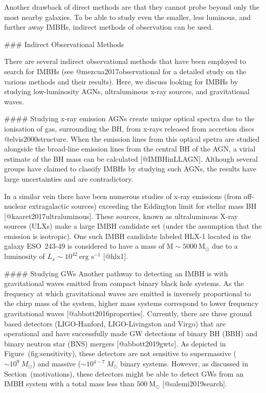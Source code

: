 {{{{{{{{{{{{{{{{Another drawback of direct methods are that they cannot probe beyond
only the most nearby galaxies. To be able to study even the smaller, less
luminous, and further away IMBHs, indirect methods of observation can be
used.

### Indirect Observational Methods

There are several indirect observational methods that have been employed
to search for IMBHs (see @mezcua2017observational for a detailed
study on the various methods and their results). Here, we discuss
looking for IMBHs by studying low-luminosity AGNs, ultraluminous x-ray
sources, and gravitational waves.

#### Studying x-ray emission
AGNs create unique optical spectra due to the ionisation of gas,
surrounding the BH, from x-rays released from accretion discs
@elvis2000structure. When the emission lines from this optical spetra are
studied alongside the broad-line emission lines from the central BH of
the AGN, a virial estimate of the BH mass can be calculated
[@IMBHinLLAGN]. Although several groups have claimed to classify IMBHs
by studying such AGNs, the results have large uncertainties and are
contradictory.

In a similar vein there have been numerous studies of x-ray emissions
(from off-nuclear extragalactic sources) exceeding the Eddington limit
for stellar mass BH [@kaaret2017ultraluminous]. These sources, known as
ultraluminous X-ray sources (ULXs) make a large IMBH candidate set
(under the assumption that the emission is isotropic). One such IMBH
candidate labeled HLX-1 located in the galaxy ESO~243-49 is considered
to have a mass of $\text{M}\sim5000\ \text{M}_{\odot}$ due to a luminosity of
$L_x\sim10^{42}\ \text{erg s}^{-1}$ [@hlx1].

#### Studying GWs
Another pathway to detecting an IMBH is with gravitational waves emitted
from compact binary black hole systems. As the frequency at which
gravitational waves are emitted is inversely proportional to the chirp
mass of the system, higher mass systems correspond to lower frequency
gravitational waves [@abbott2016properties]. Currently, there are three
ground based detectors (LIGO-Hanford, LIGO-Livingston and Virgo) that
are operational and have successfully made GW detections of binary BH
(BBH) and binary neutron star (BNS) mergers [@abbott2019gwtc]. As
depicted in Figure~\@ref(fig:sensitivity), these detectors are not
sensitive to supermassive ($\sim10^9\ M_{\odot}$) and massive
($\sim10^{4-7}\ M_{\odot}$ binary systems. However, as discussed
in Section~\@ref(motivations), these detectors might be able to detect
GWs from an IMBH system with a total mass less than $500\
\text{M}_{\odot}$ [@salemi2019search].


}}}}}}}}}}}}}}}}
